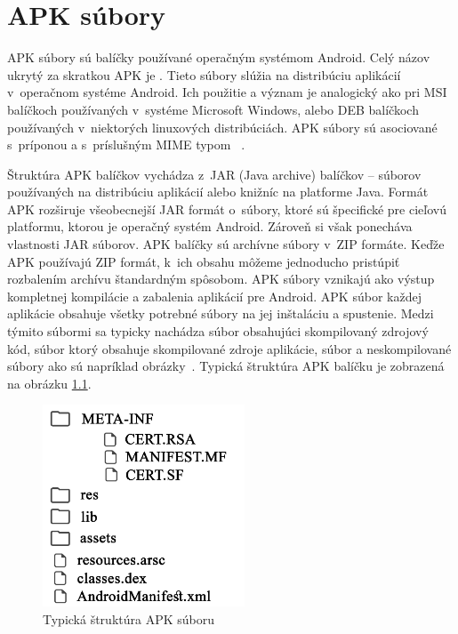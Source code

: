\chapter{APK súbory}
\label{APKsubory}
APK súbory sú balíčky používané operačným systémom Android. Celý názov ukrytý za skratkou APK je . Tieto súbory slúžia na distribúciu aplikácií v~operačnom systéme Android. Ich použitie a význam je analogický ako pri MSI balíčkoch používaných v~systéme Microsoft Windows, alebo DEB balíčkoch používaných v~niektorých linuxových distribúciách. APK súbory sú asociované s~príponou  a s~príslušným MIME typom ~\cite{Freed2016}.

Štruktúra APK balíčkov vychádza z~JAR (Java archive) balíčkov -- súborov používaných na distribúciu aplikácií alebo knižníc na platforme Java. Formát APK rozširuje všeobecnejší JAR formát o~súbory, ktoré sú špecifické pre cieľovú platformu, ktorou je operačný systém Android. Zároveň si však ponecháva vlastnosti JAR súborov. APK balíčky sú archívne súbory v~ZIP formáte. Keďže APK používajú ZIP formát, k~ich obsahu môžeme jednoducho pristúpiť rozbalením archívu štandardným spôsobom.  APK súbory vznikajú ako výstup kompletnej kompilácie a zabalenia aplikácií pre Android. APK súbor každej aplikácie obsahuje všetky potrebné súbory na jej inštaláciu a spustenie. Medzi týmito súbormi sa typicky nachádza súbor  obsahujúci skompilovaný zdrojový kód, súbor  ktorý obsahuje skompilované zdroje aplikácie, súbor  a neskompilované súbory ako sú napríklad obrázky~\cite{buildingAndRunning}. Typická štruktúra APK balíčku je zobrazená na obrázku \ref{fig:strukturaApk}.
\begin{figure}[htb]
  \begin{center}
    \includegraphics[width=60mm]{images/apkStructure.pdf}
  \end{center}
  \caption{Typická štruktúra APK súboru}
  \label{fig:strukturaApk}
\end{figure}

